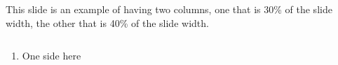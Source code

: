 \begin{frame}
    \Large
    This slide is an example of having two columns, one that is 30\% of the slide width, the other that is 40\% of the slide width.
    \begin{columns}
        \begin{column}{0.3\textwidth}
            \begin{enumerate}
                \item One side here
            \end{enumerate}
        \end{column}
        \begin{column}{0.4\textwidth}
        \end{column}
        \begin{column}{0.4\textwidth}
        \end{column}
    \end{columns}
\end{frame}